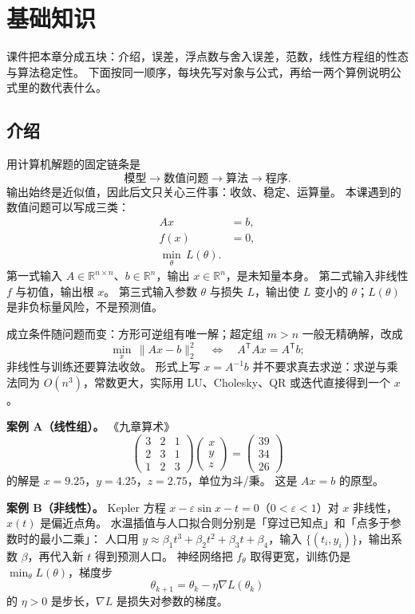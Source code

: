 \chapter{基础知识}

课件把本章分成五块：介绍，误差，浮点数与舍入误差，范数，线性方程组的性态与算法稳定性。
下面按同一顺序，每块先写对象与公式，再给一两个算例说明公式里的数代表什么。

\section{介绍}

用计算机解题的固定链条是
\[
\text{模型}\to\text{数值问题}\to\text{算法}\to\text{程序}.
\]
输出始终是近似值，因此后文只关心三件事：收敛、稳定、运算量。
本课遇到的数值问题可以写成三类：
\begin{align}
Ax&=b,\\
f(x)&=0,\\
\min_{\theta}\,L(\theta).
\end{align}
第一式输入 $A\in\mathbb{R}^{n\times n}$、$b\in\mathbb{R}^n$，输出 $x\in\mathbb{R}^n$，是未知量本身。
第二式输入非线性 $f$ 与初值，输出根 $x$。
第三式输入参数 $\theta$ 与损失 $L$，输出使 $L$ 变小的 $\theta$；$L(\theta)$ 是非负标量风险，不是预测值。

成立条件随问题而变：方形可逆组有唯一解；超定组 $m>n$ 一般无精确解，改成
\[
\min_x\,\lVert Ax-b\rVert_2^2
\quad\Leftrightarrow\quad
A^{\mathsf T}Ax=A^{\mathsf T}b;
\]
非线性与训练还要算法收敛。
形式上写 $x=A^{-1}b$ 并不要求真去求逆：求逆与乘法同为 $O(n^3)$，常数更大，实际用 LU、Cholesky、QR 或迭代直接得到一个 $x$。

\textbf{案例 A（线性组）。}
《九章算术》
\[
\begin{pmatrix}3&2&1\\2&3&1\\1&2&3\end{pmatrix}
\begin{pmatrix}x\\y\\z\end{pmatrix}
=\begin{pmatrix}39\\34\\26\end{pmatrix}
\]
的解是 $x=9.25$，$y=4.25$，$z=2.75$，单位为斗/秉。
这是 $Ax=b$ 的原型。

\textbf{案例 B（非线性）。}
Kepler 方程 $x-\varepsilon\sin x-t=0$（$0<\varepsilon<1$）对 $x$ 非线性，$x(t)$ 是偏近点角。
水温插值与人口拟合则分别是「穿过已知点」和「点多于参数时的最小二乘」：
人口用 $y\approx\beta_1 t^3+\beta_2 t^2+\beta_3 t+\beta_4$，输入 $\{(t_i,y_i)\}$，输出系数 $\beta$，再代入新 $t$ 得到预测人口。
神经网络把 $f_\theta$ 取得更宽，训练仍是 $\min_\theta L(\theta)$，梯度步
\[
\theta_{k+1}=\theta_k-\eta\nabla L(\theta_k)
\]
的 $\eta>0$ 是步长，$\nabla L$ 是损失对参数的梯度。

